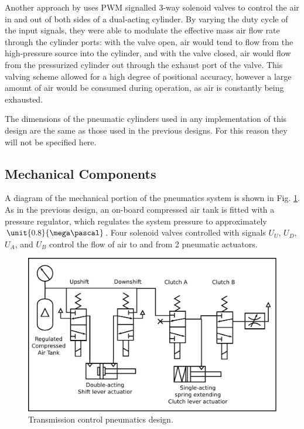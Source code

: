 Another approach by \citet{accurate_position} uses PWM signalled 3-way solenoid valves to control the air in and out of both sides of a dual-acting cylinder. By varying the duty cycle of the input signals, they were able to modulate the effective mass air flow rate through the cylinder ports: with the valve open, air would tend to flow from the high-pressure source into the cylinder, and with the valve closed, air would flow from the pressurized cylinder out through the exhaust port of the valve. This valving scheme allowed for a high degree of positional accuracy, however a large amount of air would be consumed during operation, as air is constantly being exhausted.

The dimensions of the pneumatic cylinders used in any implementation of this design are the same as those used in the previous designs. For this reason they will not be specified here.

\subsection{Mechanical Components}

A diagram of the mechanical portion of the pneumatics system is shown in Fig. \ref{fig:pneumatics_design}. As in the previous design, an on-board compressed air tank is fitted with a pressure regulator, which regulates the system pressure to approximately $\unit{0.8}{\mega\pascal}$. Four solenoid valves controlled with signals $U_U$, $U_D$, $U_A$, and $U_B$ control the flow of air to and from 2 pneumatic actuators.

\begin{figure}[H]
	\centering
	\includegraphics[scale=0.5]{design/figures/pneumatics}
	\caption{Transmission control pneumatics design.}
	\label{fig:pneumatics_design}
\end{figure}

